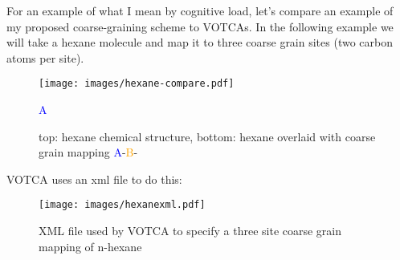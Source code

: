 For an example of what I mean by cognitive load, let's compare an example of my proposed coarse-graining scheme to VOTCAs.
In the following example we will take a hexane molecule and map it to three coarse grain sites (two carbon atoms per site).

\begin{wrapfigure}{L}{0.5\linewidth}
    \centering
    \texttt{[image: images/hexane-compare.pdf]}
    \caption{top: hexane chemical structure, bottom: hexane overlaid with coarse grain mapping \textcolor{blue}{A}-\textcolor{orange}{B}-}\textcolor{blue}{A}
    \label{fig:hexane}
\end{wrapfigure}

VOTCA uses an xml file to do this:


\begin{wrapfigure}{L}{0.5\linewidth}
    \centering
    \texttt{[image: images/hexanexml.pdf]}
    \caption{XML file used by VOTCA to specify a three site coarse grain mapping of n-hexane}
    \label{fig:hexanexml}
\end{wrapfigure}

